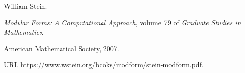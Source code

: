 William Stein.

\newblock \emph{Modular Forms: A Computational Approach}, volume~79 of
  \emph{Graduate Studies in Mathematics}.

\newblock American Mathematical Society, 2007.

\newblock URL \url{https://www.wstein.org/books/modform/stein-modform.pdf}.